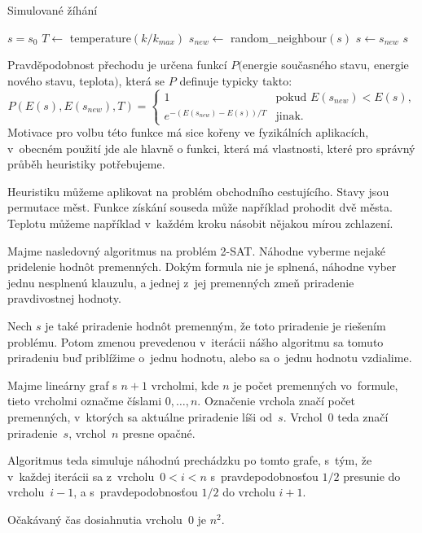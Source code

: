 \begin{algorithm}
\caption{Simulované žíhání}
\begin{algorithmic}[1]
    \State $s = s_0$
        \State $T \gets $ temperature$(k / k_{max})$
        \State $s_{new} \gets $ random\_neighbour$(s)$
            \State $s \gets s_{new}$
        \EndIf
    \EndFor
    \State \Return $s$
\EndFunction
\end{algorithmic}
\end{algorithm}

Pravděpodobnost přechodu je určena funkcí $P($energie současného stavu,
energie nového stavu, teplota$)$, která se $P$ definuje typicky takto:
\[
    P(E(s), E(s_{new}), T) =
    \begin{cases}
        1 & \text{pokud } E(s_{new}) < E(s), \\
        e^{-(E(s_{new}) - E(s)) / T} & \text{jinak.}
    \end{cases}
\]
Motivace pro volbu této funkce má sice kořeny ve fyzikálních aplikacích,
v~obecném použití jde ale hlavně o funkci, která má vlastnosti, které
pro správný průběh heuristiky potřebujeme.

Heuristiku můžeme aplikovat na problém obchodního cestujícího. Stavy
jsou permutace měst. Funkce získání souseda může například prohodit
dvě města. Teplotu můžeme například v~každém kroku násobit nějakou mírou
zchlazení.

\begin{example}
	Majme nasledovný algoritmus na problém 2-SAT. Náhodne vyberme nejaké
	pridelenie hodnôt premenných. Dokým formula nie je splnená, náhodne 
	vyber jednu nesplnenú klauzulu, a jednej z~jej premenných zmeň priradenie
	pravdivostnej hodnoty. 
	
	Nech $s$ je také priradenie hodnôt premenným, že toto priradenie je riešením
	problému. Potom zmenou prevedenou v~iterácii nášho algoritmu sa tomuto priradeniu
	buď priblížime o~jednu hodnotu, alebo sa o~jednu hodnotu vzdialime.
	
	Majme lineárny graf s $n+1$ vrcholmi, kde $n$ je počet premenných vo~formule,
	tieto vrcholmi označme číslami $0, \ldots, n$. Označenie vrchola značí
	počet premenných, v~ktorých sa aktuálne priradenie líši od~$s$. Vrchol~$0$
	teda značí priradenie~$s$, vrchol~$n$ presne opačné.
	
	Algoritmus teda simuluje náhodnú prechádzku po tomto grafe, s~tým, že v~každej
	iterácii sa z~vrcholu~$0 < i < n$ s~pravdepodobnosťou $1/2$ presunie do vrcholu~$i-1$,
	a s~pravdepodobnosťou $1/2$ do vrcholu $i+1$. 
	
	Očakávaný čas dosiahnutia vrcholu~$0$ je $n^2$.
\end{example}

